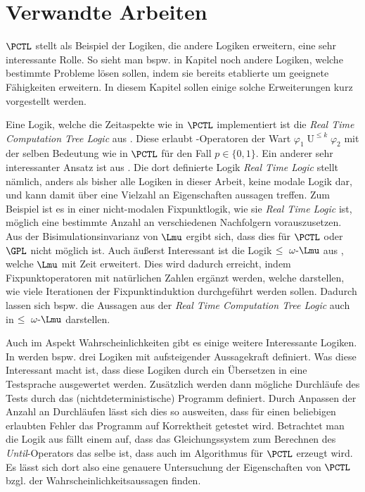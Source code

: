 \section{Verwandte Arbeiten}

$\PCTL$ stellt als Beispiel der Logiken, die andere Logiken erweitern, eine sehr interessante Rolle.
So sieht man bspw. in Kapitel noch andere Logiken, welche bestimmte Probleme lösen sollen, indem sie bereits etablierte um geeignete Fähigkeiten erweitern.
In diesem Kapitel sollen einige solche Erweiterungen kurz vorgestellt werden.

Eine Logik, welche die Zeitaspekte wie in $\PCTL$ implementiert ist die \textit{Real Time Computation Tree Logic} aus \cite{emerson1991quantitative}. 
Diese erlaubt -Operatoren der Wart $\varphi_1 \operatorname{U}^{\leq k} \varphi_2$ mit der selben Bedeutung wie in $\PCTL$ für den Fall $p\in \{0,1\}$.
Ein anderer sehr interessanter Ansatz ist aus \cite{jahanian1986safety}.
Die dort definierte Logik \textit{Real Time Logic} stellt nämlich, anders als bisher alle Logiken in dieser Arbeit, keine modale Logik dar, und kann damit über eine Vielzahl an Eigenschaften aussagen treffen.
Zum Beispiel ist es in einer nicht-modalen Fixpunktlogik, wie sie \textit{Real Time Logic} ist, möglich eine bestimmte Anzahl an verschiedenen Nachfolgern vorauszusetzen.
Aus der Bisimulationsinvarianz von $\Lmu$ ergibt sich, dass dies für $\PCTL$ oder $\GPL$ nicht möglich ist.
Auch äußerst Interessant ist die Logik $\leq\text{ }\omega\text{-}\Lmu$ aus \cite{emerson1991real}, welche $\Lmu$ mit Zeit erweitert.
Dies wird dadurch erreicht, indem Fixpunktoperatoren mit natürlichen Zahlen ergänzt werden, welche darstellen, wie viele Iterationen der Fixpunktinduktion durchgeführt werden sollen.
Dadurch lassen sich bspw. die Aussagen aus der \textit{Real Time Computation Tree Logic} auch in $\leq\text{ }\omega\text{-}\Lmu$ darstellen.

Auch im Aspekt Wahrscheinlichkeiten gibt es einige weitere Interessante Logiken. 
In \cite{larsen1989bisimulation} werden bspw. drei Logiken mit aufsteigender Aussagekraft definiert.
Was diese Interessant macht ist, dass diese Logiken durch ein Übersetzen in eine \glqq Testsprache\grqq{} ausgewertet werden.
Zusätzlich werden dann mögliche Durchläufe des Tests durch das (nichtdeterministische) Programm definiert.
Durch Anpassen der Anzahl an Durchläufen lässt sich dies so ausweiten, dass für einen beliebigen erlaubten Fehler das Programm auf Korrektheit getestet wird.
Betrachtet man die Logik aus \cite{courcoubetis1995complexity} fällt einem auf, dass das Gleichungssystem zum Berechnen des \textit{Until}-Operators das selbe ist, dass auch im Algorithmus für $\PCTL$ erzeugt wird.
Es lässt sich dort also eine genauere Untersuchung der Eigenschaften von $\PCTL$ bzgl. der Wahrscheinlichkeitsaussagen finden.


